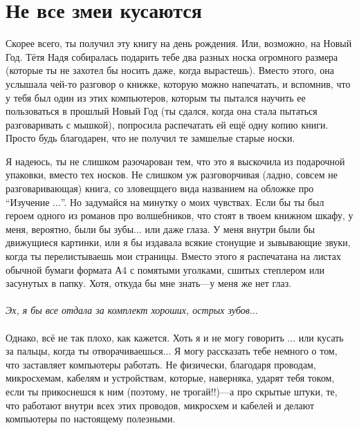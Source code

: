 

\chapter{Не все змеи кусаются}\label{ch:notallsnakeswillsquishyou}

Скорее всего, ты получил эту книгу на день рождения. Или, возможно, на Новый Год. Тётя Надя собиралась подарить тебе два разных носка огромного размера (которые ты не захотел бы носить даже, когда вырастешь). Вместо этого, она услышала чей-то разговор о книжке, которую можно напечатать, и вспомнив, что у тебя был один из этих компьютеров, которым ты пытался научить ее пользоваться в прошлый Новый Год (ты сдался, когда она стала пытаться разговаривать с мышкой), попросила распечатать ей ещё одну копию книги. Просто будь благодарен, что не получил те замшелые старые носки.

Я надеюсь, ты не слишком разочарован тем, что это я выскочила из подарочной упаковки, вместо тех носков. Не слишком уж разговорчивая (ладно, совсем не разговаривающая) книга, со зловещщего вида названием на обложке про ``Изучение $\ldots$''.
Но задумайся на минутку о моих чувствах. Если бы ты был героем одного из романов про волшебников, что стоят в твоем книжном шкафу, у меня, вероятно, были бы зубы... или даже глаза. У меня внутри были бы движущиеся картинки, или я бы издавала всякие стонущие и зывывающие звуки, когда ты перелистываешь мои страницы. Вместо этого я распечатана на листах обычной бумаги формата А4 с помятыми уголками, сшитых степлером или засунутых в папку. Хотя, откуда бы мне знать---у меня же нет глаз.
\\
\\
\emph{Эх, я бы все отдала за комплект хороших, острых зубов$\ldots$}
\\
\\
Однако, всё не так плохо, как кажется. Хоть я и не могу говорить ... или кусать за пальцы, когда ты отворачиваешься... Я могу рассказать тебе немного о том, что заставляет компьютеры работать. Не физически, благодаря проводам, микросхемам, кабелям и устройствам, которые, наверняка, ударят тебя током, если ты прикоснешся к ним (поэтому, не трогай!!)---а про скрытые штуки, те, что работают внутри всех этих проводов, микросхем и кабелей и делают компьютеры по настоящему полезными.

